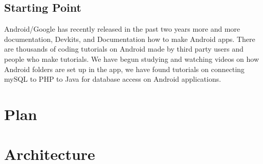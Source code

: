\documentclass[a4paper,12pt]{article}
\begin{document}
 
\subsection{Starting Point}
	Android/Google has recently released in the past two years more and more documentation, Devkits, and Documentation how to make Android apps. There are thousands of
coding tutorials on Android made by third party users and people who make tutorials. 
We have begun studying and watching videos on how Android folders are set up in the app,
we have found tutorials on connecting mySQL to PHP to Java for database access on Android
applications. 

\pagebreak

\section{Plan}

\pagebreak

\section{Architecture}
\pagebreak
\end{document}
